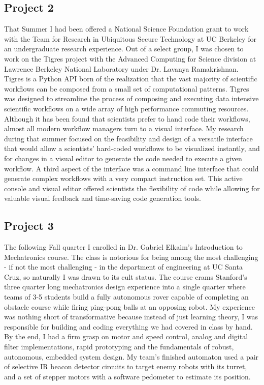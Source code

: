 \documentclass[journal, draftcls]{IEEEtran}
\begin{document}
\subsection{Project 2}
That Summer I had been offered a National Science Foundation grant to work with the Team for Research in Ubiquitous Secure Technology at UC Berkeley for an undergraduate research experience. Out of a select group, I was chosen to work on the Tigres project with the Advanced Computing for Science division at Lawrence Berkeley National Laboratory under Dr. Lavanya Ramakrishnan. Tigres is a Python API born of the realization that the vast majority of scientific workflows can be composed from a small set of computational patterns. Tigres was designed to streamline the process of composing and executing data intensive scientific workflows on a wide array of high performance commuting resources. Although it has been found that scientists prefer to hand code their workflows, almost all modern workflow managers turn to a visual interface. My research during that summer focused on the feasibility and design of a versatile interface that would allow a scientists' hard-coded workflows to be visualized instantly, and for changes in a visual editor to generate the code needed to execute a given workflow. A third aspect of the interface was a command line interface that could generate complex workflows with a very compact instruction set. This active console and visual editor offered scientists the flexibility of code while allowing for valuable visual feedback and time-saving code generation tools. 

\subsection{Project 3}
 The following Fall quarter I enrolled in Dr. Gabriel Elkaim's Introduction to Mechatronics course. The class is notorious for being among the most challenging - if not the most challenging - in the department of engineering at UC Santa Cruz, so naturally I was drawn to its cult status. The course crams Stanford's three quarter long mechatronics design experience into a single quarter where teams of 3-5 students build a fully autonomous rover capable of completing an obstacle course while firing ping-pong balls at an opposing robot. My experience was nothing short of transformative because instead of just learning theory, I was responsible for building and coding everything we had covered in class by hand. By the end, I had a firm grasp on motor and speed control, analog and digital filter implementations, rapid prototyping and the fundamentals of robust, autonomous, embedded system design. My team's finished automaton used a pair of selective IR beacon detector circuits to target enemy robots with its turret, and a set of stepper motors with a software pedometer to estimate its position.  
\end{document}
